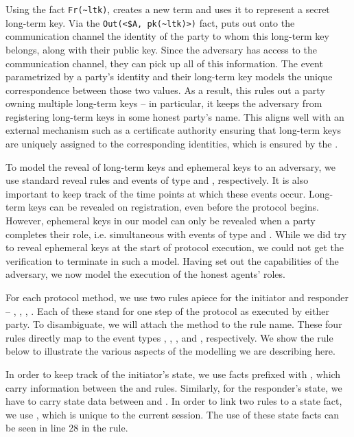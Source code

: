 Using the fact \verb|Fr(~ltk)|, \mTamarin{} creates a new term  and uses it to represent a secret long-term key.
%
Via the \verb|Out(<$A, pk(~ltk)>)| fact, \mTamarin{} puts out onto the communication channel the identity of the party to whom this long-term key belongs, along with their public key. 
%
Since the adversary has access to the communication channel, they can pick up all of this information.
%
The event  parametrized by a party's identity and their long-term key models the unique correspondence between those two values.
%
As a result, this rules out a party owning multiple long-term keys -- in particular, it keeps the adversary from registering long-term keys in some honest party's name.
%
This aligns well with an external mechanism such as a certificate authority ensuring that long-term keys are uniquely assigned to the corresponding identities, which is ensured by the \mSpec.

To model the reveal of long-term keys and ephemeral keys to an adversary, we use standard reveal rules and events of type \mRevLTK{} and \mRevEph, respectively. 
%
It is also important to keep track of the time points at which these events occur.
%
Long-term keys can be revealed on registration, even before the protocol begins.
%
However, ephemeral keys in our model can only be revealed when a party completes their role, i.e. simultaneous with events of type \mIComplete{} and \mRComplete.
%
While we did try to reveal ephemeral keys at the start of protocol execution, we could not get the verification to terminate in such a model.
%
Having set out the capabilities of the adversary, we now model the execution of the honest agents' roles.

For each protocol method, we use two rules apiece for the initiator and responder -- , , , .
%
Each of these stand for one step of the protocol as executed by either party.
%
To disambiguate, we will attach the method to the rule name.
%
These four rules directly map to the event types \mIStart, \mRStart, \mIComplete, and \mRComplete, respectively.
%
We show the  rule below to illustrate the various aspects of the \mTamarin{} modelling we are describing here.

In order to keep track of the initiator's state, we use facts prefixed with , which carry information between the  and  rules.
%
Similarly, for the responder's state, we have  to carry state data between  and .
%
In order to link two rules to a state fact, we use , which is unique to the current session.
%
The use of these state facts can be seen in line 28 in the  rule.

